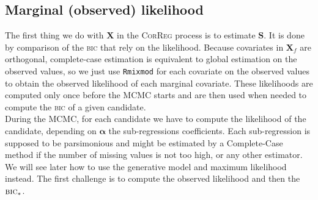 \documentclass[12pt,a4paper]{report}
\begin{document}
\subsection{Marginal (observed) likelihood}
The first thing we do with $\boldsymbol{X}$ in the \textsc{CorReg} process is to estimate $\boldsymbol{S}$. It is done by comparison of the \textsc{bic} that rely on the likelihood. Because covariates in $\boldsymbol{X}_f$ are orthogonal, complete-case estimation is equivalent to global estimation on the observed values, so we just use {\tt Rmixmod} for each covariate on the observed values to obtain the observed likelihood of each marginal covariate. These likelihoods are computed only once before the MCMC starts and are then used when needed to compute the \textsc{bic} of a given candidate.\\

	 During the MCMC, for each candidate we have to compute the likelihood of the candidate, depending on $\boldsymbol{\alpha}$ the sub-regressions coefficients. Each sub-regression is supposed to be parsimonious and might be estimated by a Complete-Case method if the number of missing values is not too high, or any other estimator. We will see later how to use the generative model and maximum likelihood instead. The first challenge is to compute the observed likelihood and then the $\textsc{bic}_*$.  \\
	 
\end{document}
